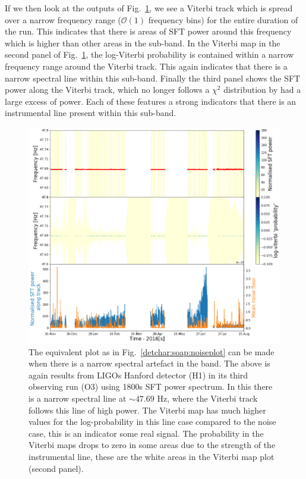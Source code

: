 If we then look at the outputs of Fig.~\ref{detchar:soap:lineplot}, we see a Viterbi track which is spread over a narrow frequency range ($\mathcal{O}(1)$ frequency bins) for the entire duration of the run.  
This indicates that there is areas of \gls{SFT} power around this frequency which is higher than other areas in the sub-band.
In the Viterbi map in the second panel of Fig.~\ref{detchar:soap:lineplot}, the log-Viterbi probability is contained within a narrow frequency range around the Viterbi track.
This again indicates that there is a narrow spectral line within this sub-band.
Finally the third panel shows the \gls{SFT} power along the Viterbi track, which no longer follows a $\chi^2$ distribution by had a large excess of power.
Each of these features a strong indicators that there is an instrumental line present within this sub-band.
%
\begin{figure}[hpt]
	\centering
	\includegraphics[width=\textwidth]{C6_detchar/track_F47_6_47_8_linenarrow.png}
	\caption[Example SOAP output for string narrow instrumental line.]{The equivalent plot as in Fig.~\ref{detchar:soap:noiseplot} can be made when there is a narrow spectral artefact in the band. The above is again results from \glspl{LIGO} Hanford detector (H1) in its third observing run (O3) using 1800s \gls{SFT} power spectrum. In this there is a narrow spectral line at $\sim 47.69$ Hz, where the Viterbi track follows this line of high power. The Viterbi map has much higher values for the log-probability in this line case compared to the noise case, this is an indicator some real signal. The probability in the Viterbi maps drops to zero in some areas due to the strength of the instrumental line, these are the white areas in the Viterbi map plot (second panel). }
	\label{detchar:soap:lineplot}
\end{figure}
%


